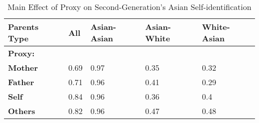 \begin{table}[H]

\caption{Main Effect of Proxy on Second-Generation's Asian Self-identification \label{tab:hispbyproxy}}
\centering
\fontsize{12}{14}\selectfont
\begin{tabular}[c]{>{}lllll}
\toprule
Parents Type & All & Asian-Asian & Asian-White & White-Asian\\
\midrule
\textbf{Proxy:} &  &  &  & \\
\hspace{1em}\textbf{Mother} & 0.69 & 0.97 & 0.35 & 0.32\\
\hspace{1em}\textbf{Father} & 0.71 & 0.96 & 0.41 & 0.29\\
\hspace{1em}\textbf{Self} & 0.84 & 0.96 & 0.36 & 0.4\\
\hspace{1em}\textbf{Others} & 0.82 & 0.96 & 0.47 & 0.48\\
\bottomrule
\end{tabular}
\end{table}
